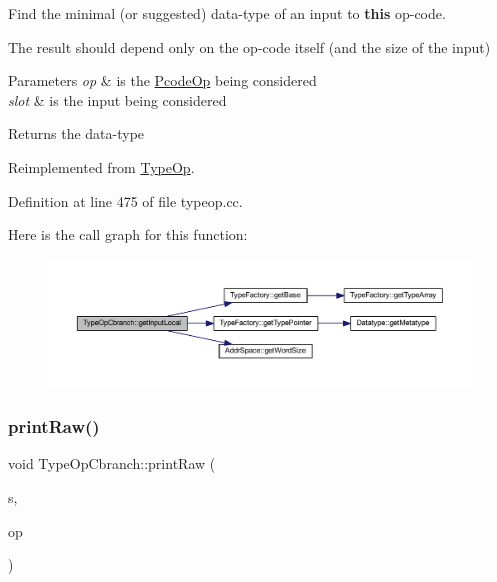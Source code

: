 Find the minimal (or suggested) data-\/type of an input to {\bfseries{this}} op-\/code. 

The result should depend only on the op-\/code itself (and the size of the input) 
\begin{DoxyParams}{Parameters}
{\em op} & is the \mbox{\hyperlink{class_pcode_op}{Pcode\+Op}} being considered \\
\hline
{\em slot} & is the input being considered \\
\hline
\end{DoxyParams}
\begin{DoxyReturn}{Returns}
the data-\/type 
\end{DoxyReturn}


Reimplemented from \mbox{\hyperlink{class_type_op_abe2e4b619932cf94bafb084963a0fc66}{Type\+Op}}.



Definition at line 475 of file typeop.\+cc.

Here is the call graph for this function\+:
\nopagebreak
\begin{figure}[H]
\begin{center}
\leavevmode
\includegraphics[width=350pt]{class_type_op_cbranch_af7d6764f79c316780136fab4e67b8a3f_cgraph}
\end{center}
\end{figure}
\mbox{\label{class_type_op_cbranch_acaea1b1ce2d5cce9753e658fb69cb1f4}} 
\subsubsection{\texorpdfstring{printRaw()}{printRaw()}}
{\footnotesize\ttfamily void Type\+Op\+Cbranch\+::print\+Raw (\begin{DoxyParamCaption}\item[{ostream \&}]{s,  }\item[{const \mbox{\hyperlink{class_pcode_op}{Pcode\+Op}} $\ast$}]{op }\end{DoxyParamCaption})\hspace{0.3cm}{\ttfamily [virtual]}}



